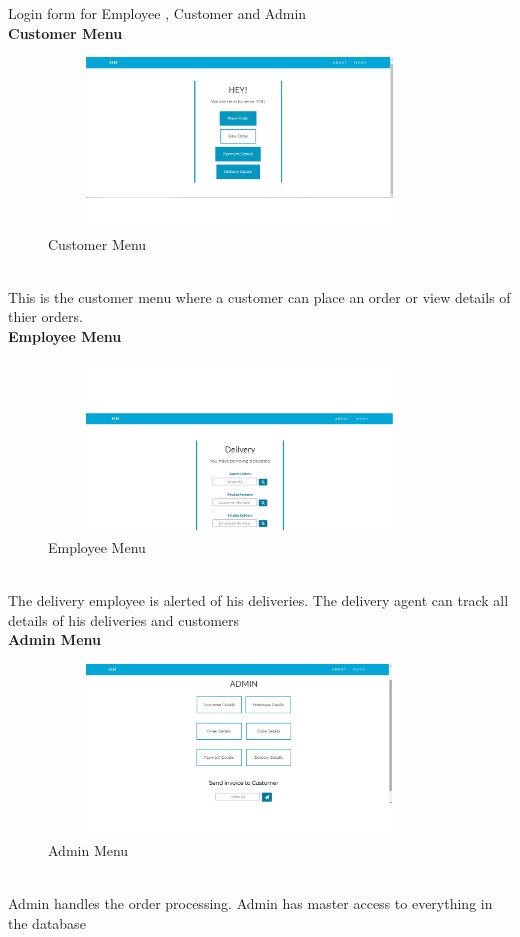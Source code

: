 \documentclass[12pt,a4paper]{report}
\begin{document}
\noindent
Login form for Employee , Customer and Admin\\
\linebreak
\textbf{Customer Menu}\\
\begin{figure}[hbtp]
\centering
\includegraphics[width=4in,height=1.8in]{../fig/customermenu}
\caption{Customer Menu}
\end{figure}\\
\noindent
This is the customer menu where a customer can place an order or view details of thier orders.\\
\linebreak
\textbf{Employee Menu}\\
\begin{figure}[hbtp]
\centering
\includegraphics[width=4in,height=1.8in]{../fig/employeemenu}
\caption{Employee Menu}
\end{figure}\\
\noindent
The delivery employee is alerted of his deliveries. The delivery agent can track all details of his deliveries and customers\\
\linebreak
\newpage
\textbf{Admin Menu}\\
\begin{figure}[hbtp]
\centering
\includegraphics[width=4in,height=1.8in]{../fig/adminmenu}
\caption{Admin Menu}
\end{figure}\\
\noindent
Admin handles the order processing. Admin has master access to everything in the database\\
\end{document}
